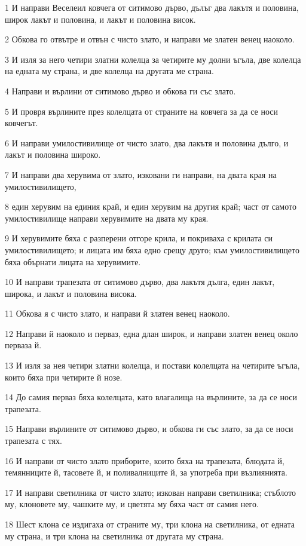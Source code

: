 \par 1 И направи Веселеил ковчега от ситимово дърво, дълъг два лакътя и половина, широк лакът и половина, и лакът и половина висок.
\par 2 Обкова го отвътре и отвън с чисто злато, и направи ме златен венец наоколо.
\par 3 И изля за него четири златни колелца за четирите му долни ъгъла, две колелца на едната му страна, и две колелца на другата ме страна.
\par 4 Направи и върлини от ситимово дърво и обкова ги със злато.
\par 5 И провря върлините през колелцата от страните на ковчега за да се носи ковчегът.
\par 6 И направи умилостивилище от чисто злато, два лакътя и половина дълго, и лакът и половина широко.
\par 7 И направи два херувима от злато, изковани ги направи, на двата края на умилостивилището,
\par 8 един херувим на единия край, и един херувим на другия край; част от самото умилостивилище направи херувимите на двата му края.
\par 9 И херувимите бяха с разперени отгоре крила, и покриваха с крилата си умилостивилището; и лицата им бяха едно срещу друго; към умилостивилището бяха обърнати лицата на херувимите.
\par 10 И направи трапезата от ситимово дърво, два лакътя дълга, един лакът, широка, и лакът и половина висока.
\par 11 Обкова я с чисто злато, и направи й златен венец наоколо.
\par 12 Направи й наоколо и перваз, една длан широк, и направи златен венец около перваза й.
\par 13 И изля за нея четири златни колелца, и постави колелцата на четирите ъгъла, които бяха при четирите й нозе.
\par 14 До самия перваз бяха колелцата, като влагалища на върлините, за да се носи трапезата.
\par 15 Направи върлините от ситимово дърво, и обкова ги със злато, за да се носи трапезата с тях.
\par 16 И направи от чисто злато приборите, които бяха на трапезата, блюдата й, темянниците й, тасовете й, и поливалниците й, за употреба при възлиянията.
\par 17 И направи светилника от чисто злато; изкован направи светилника; стъблото му, клоновете му, чашките му, и цветята му бяха част от самия него.
\par 18 Шест клона се издигаха от страните му, три клона на светилника, от едната му страна, и три клона на светилника от другата му страна.
